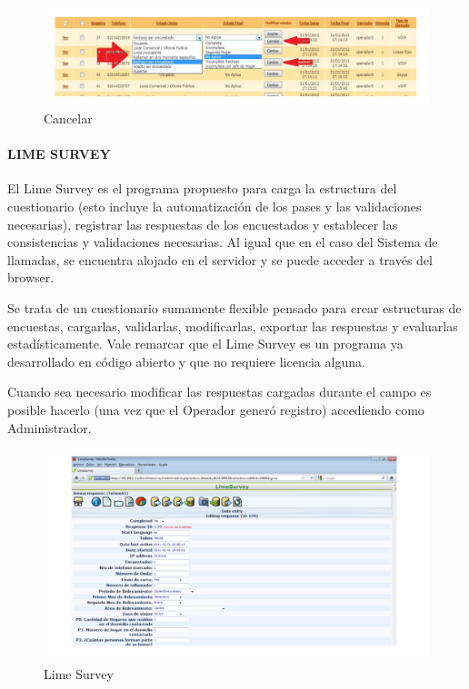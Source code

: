 \documentclass[
  openany]{book}
\begin{document}
\begin{figure}

{\centering \includegraphics[width=1\linewidth]{imagenes/figura6-09} 

}

\caption{Cancelar}\label{fig:Canc}
\end{figure}

\hypertarget{lime-survey}{%
\paragraph{\texorpdfstring{\textbf{LIME SURVEY}}{LIME SURVEY}}\label{lime-survey}}

El Lime Survey es el programa propuesto para carga la estructura del cuestionario (esto incluye la automatización de los pases y las validaciones necesarias), registrar las respuestas de los encuestados y establecer las consistencias y validaciones necesarias. Al igual que en el caso del Sistema de llamadas, se encuentra alojado en el servidor y se puede acceder a través del browser.

Se trata de un cuestionario sumamente flexible pensado para crear estructuras de encuestas, cargarlas, validarlas, modificarlas, exportar las respuestas y evaluarlas estadísticamente. Vale remarcar que el Lime Survey es un programa ya desarrollado en código abierto y que no requiere licencia alguna.

Cuando sea necesario modificar las respuestas cargadas durante el campo es posible hacerlo (una vez que el Operador generó registro) accediendo como Administrador.

\begin{figure}

{\centering \includegraphics[width=1\linewidth]{imagenes/figura6-10} 

}

\caption{Lime Survey}\label{fig:Lime}
\end{figure}
\end{document}
